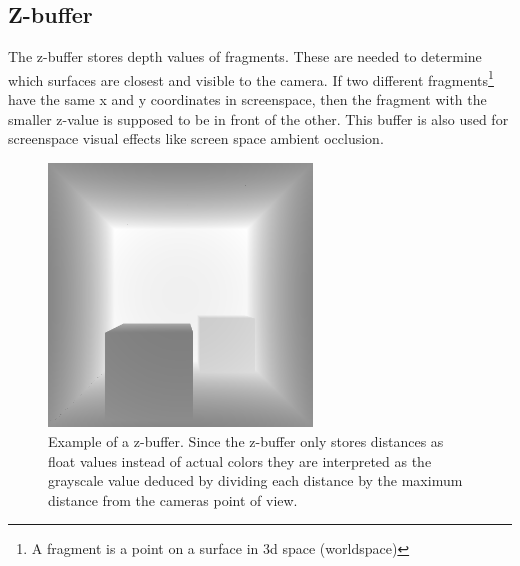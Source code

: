 \documentclass{ACGSeminar}
\begin{document}
	\subsection{Z-buffer}
		The z-buffer stores depth values of fragments. These are needed to determine which surfaces are closest and visible to the camera. If two different fragments\footnote{A fragment is a point on a surface in 3d space (worldspace\footnotemark)} have the same x and y coordinates in screenspace\footnotemark, then the fragment with the smaller z-value is supposed to be in front of the other. This buffer is also used for screenspace visual effects like screen space ambient occlusion. 
		\addtocounter{footnote}{-1}
		\begin{figure}[htb!]%
			\begin{center}%
				\includegraphics[width=7cm]{img/z_buffer.png}
			\end{center}%
			\caption{Example of a z-buffer. Since the z-buffer only stores distances as float values instead of actual colors they are interpreted as the grayscale value deduced by dividing each
			distance by the maximum distance from the cameras point of view.}%
			\label{fig:z_buffer}%
		\end{figure}%
\end{document}
